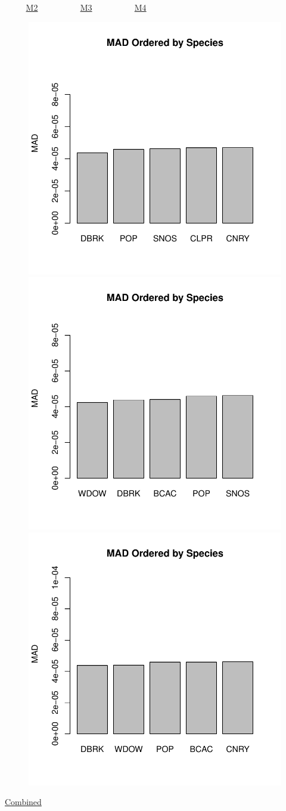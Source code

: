 \documentclass[ xcolor = pdftex, dvipsnames, table ]{beamer}
\begin{document}
\begin{frame}{$~~~~~~~~~~$ \href{https://github.com/gasduster99/sppComp/tree/master/sscRuns/25019781982M2}{M2} $~~~~~~~~~~~~~~~~~~~~$ \href{https://github.com/gasduster99/sppComp/tree/master/sscRuns/25019781982M3}{M3} $~~~~~~~~~~~~~~~~~~~~$ \href{https://github.com/gasduster99/sppComp/tree/master/sscRuns/25019781982M4}{M4} }	
	\begin{figure}[ht!]
        \centering
	\hspace*{-1cm}
        \includegraphics[width=.4\textwidth]{../sscRuns/25019781982M2/sppHeadMad68.pdf}
        \includegraphics[width=.4\textwidth]{../sscRuns/25019781982M3/sppHeadMad68.pdf}
	\includegraphics[width=.4\textwidth]{../sscRuns/25019781982M4/sppHeadMad68.pdf}
	\end{figure}
	\vspace{-1cm}
	\begin{center}
	\Large
	\href{https://github.com/gasduster99/sppComp/tree/master/try1/postSSC/25019781982M2M3M4}{Combined}
	\end{center}
\end{frame}
\end{document}
